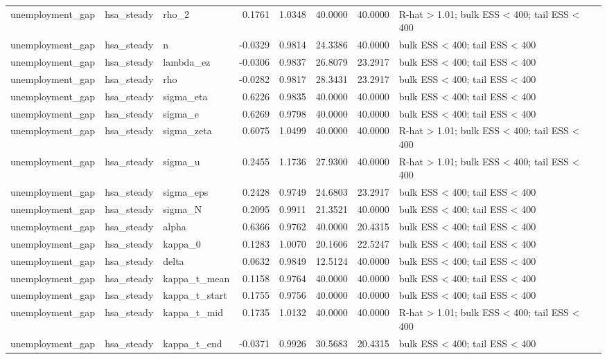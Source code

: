 \begin{tabular}{lllrrrrl}
unemployment\_gap & hsa\_steady & rho\_2 & 0.1761 & 1.0348 & 40.0000 & 40.0000 & R-hat > 1.01; bulk ESS < 400; tail ESS < 400 \\
unemployment\_gap & hsa\_steady & n & -0.0329 & 0.9814 & 24.3386 & 40.0000 & bulk ESS < 400; tail ESS < 400 \\
unemployment\_gap & hsa\_steady & lambda\_ez & -0.0306 & 0.9837 & 26.8079 & 23.2917 & bulk ESS < 400; tail ESS < 400 \\
unemployment\_gap & hsa\_steady & rho & -0.0282 & 0.9817 & 28.3431 & 23.2917 & bulk ESS < 400; tail ESS < 400 \\
unemployment\_gap & hsa\_steady & sigma\_eta & 0.6226 & 0.9835 & 40.0000 & 40.0000 & bulk ESS < 400; tail ESS < 400 \\
unemployment\_gap & hsa\_steady & sigma\_e & 0.6269 & 0.9798 & 40.0000 & 40.0000 & bulk ESS < 400; tail ESS < 400 \\
unemployment\_gap & hsa\_steady & sigma\_zeta & 0.6075 & 1.0499 & 40.0000 & 40.0000 & R-hat > 1.01; bulk ESS < 400; tail ESS < 400 \\
unemployment\_gap & hsa\_steady & sigma\_u & 0.2455 & 1.1736 & 27.9300 & 40.0000 & R-hat > 1.01; bulk ESS < 400; tail ESS < 400 \\
unemployment\_gap & hsa\_steady & sigma\_eps & 0.2428 & 0.9749 & 24.6803 & 23.2917 & bulk ESS < 400; tail ESS < 400 \\
unemployment\_gap & hsa\_steady & sigma\_N & 0.2095 & 0.9911 & 21.3521 & 40.0000 & bulk ESS < 400; tail ESS < 400 \\
unemployment\_gap & hsa\_steady & alpha & 0.6366 & 0.9762 & 40.0000 & 20.4315 & bulk ESS < 400; tail ESS < 400 \\
unemployment\_gap & hsa\_steady & kappa\_0 & 0.1283 & 1.0070 & 20.1606 & 22.5247 & bulk ESS < 400; tail ESS < 400 \\
unemployment\_gap & hsa\_steady & delta & 0.0632 & 0.9849 & 12.5124 & 40.0000 & bulk ESS < 400; tail ESS < 400 \\
unemployment\_gap & hsa\_steady & kappa\_t\_mean & 0.1158 & 0.9764 & 40.0000 & 40.0000 & bulk ESS < 400; tail ESS < 400 \\
unemployment\_gap & hsa\_steady & kappa\_t\_start & 0.1755 & 0.9756 & 40.0000 & 40.0000 & bulk ESS < 400; tail ESS < 400 \\
unemployment\_gap & hsa\_steady & kappa\_t\_mid & 0.1735 & 1.0132 & 40.0000 & 40.0000 & R-hat > 1.01; bulk ESS < 400; tail ESS < 400 \\
unemployment\_gap & hsa\_steady & kappa\_t\_end & -0.0371 & 0.9926 & 30.5683 & 20.4315 & bulk ESS < 400; tail ESS < 400 \\

\end{tabular}

